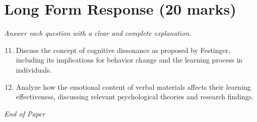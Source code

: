 \documentclass[12pt]{article}
\begin{document}
\section*{Long Form Response (20 marks)}
\textit{Answer each question with a clear and complete explanation.}
\begin{enumerate}[label=\arabic*.]
\setcounter{enumi}{10}
\item Discuss the concept of cognitive dissonance as proposed by Festinger, including its implications for behavior change and the learning process in individuals.
\item Analyze how the emotional content of verbal materials affects their learning effectiveness, discussing relevant psychological theories and research findings.
\end{enumerate}

\vfill
\noindent\textit{End of Paper}
\end{document}

